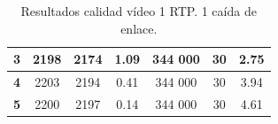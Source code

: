 \documentclass[a4paper,11pt]{book}
\begin{document}
\begin{table}[tb]
\begin{tabular}{|c|c|c|c|c|c|c|}
{\bf 3}       & 2198                                                               & 2174                                                                & 1.09                & 344 000           & 30                                                                 & 2.75                                                        \\ \hline
{\bf 4}       & 2203                                                               & 2194                                                                & 0.41                & 344 000           & 30                                                                 & 3.94                                                        \\ \hline
{\bf 5}       & 2200                                                               & 2197                                                                & 0.14                & 344 000           & 30                                                                 & 4.61                                                        \\ \hline
\end{tabular}
\caption{Resultados calidad vídeo 1 \ac{RTP}. 1 caída de enlace.}
\label{tab:calidad1}
\end{table}
\end{document}
